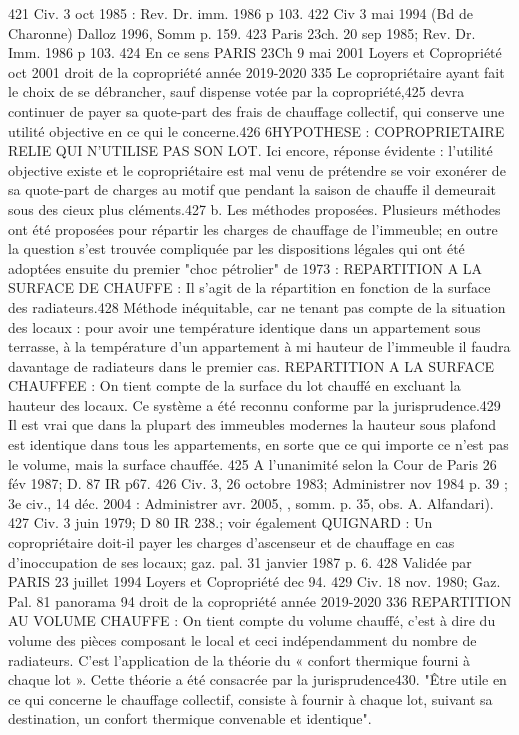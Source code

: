 		421 Civ. 3 oct 1985 : Rev. Dr. imm. 1986 p 103.
		422 Civ 3 mai 1994 (Bd de Charonne) Dalloz 1996, Somm p. 159.
		423 Paris 23\degres ch. 20 sep 1985; Rev. Dr. Imm. 1986 p 103.
		424 En ce sens PARIS 23\degres Ch 9 mai 2001 Loyers et Copropriété oct 2001 
		droit de la copropriété année 2019-2020
		335
		Le copropriétaire ayant fait le choix de se débrancher, sauf dispense votée par la copropriété,425 devra continuer de payer sa quote-part des frais de chauffage collectif, qui conserve une utilité objective en ce qui le concerne.426
		6\degres HYPOTHESE : COPROPRIETAIRE RELIE QUI N’UTILISE PAS SON LOT.
		Ici encore, réponse évidente : l’utilité objective existe et le copropriétaire est mal venu de prétendre se voir exonérer de sa quote-part de charges au motif que pendant la saison de chauffe il demeurait sous des cieux plus cléments.427
		b. Les méthodes proposées.
		Plusieurs méthodes ont été proposées pour répartir les charges de chauffage de l'immeuble; en outre la question s'est trouvée compliquée par les dispositions légales qui ont été adoptées ensuite du premier "choc pétrolier" de 1973 :
		REPARTITION A LA SURFACE DE CHAUFFE :
		Il s'agit de la répartition en fonction de la surface des radiateurs.428
		Méthode inéquitable, car ne tenant pas compte de la situation des locaux : pour avoir une température identique dans un appartement sous terrasse, à la température d'un appartement à mi hauteur de l'immeuble il faudra davantage de radiateurs dans le premier cas.
		REPARTITION A LA SURFACE CHAUFFEE :
		On tient compte de la surface du lot chauffé en excluant la hauteur des locaux.
		Ce système a été reconnu conforme par la jurisprudence.429 Il est vrai que dans la plupart des immeubles modernes la hauteur sous plafond est identique dans tous les appartements, en sorte que ce qui importe ce n'est pas le volume, mais la surface chauffée.
		425 A l’unanimité selon la Cour de Paris 26 fév 1987; D. 87 IR p67. 426 Civ. 3\degres, 26 octobre 1983; Administrer nov 1984 p. 39 ; 3e civ., 14 déc. 2004 : Administrer avr. 2005, , somm. p. 35, obs. A. Alfandari).
		427 Civ. 3 juin 1979; D 80 IR 238.; voir également QUIGNARD : Un copropriétaire doit-il payer les charges d’ascenseur et de chauffage en cas d’inoccupation de ses locaux; gaz. pal. 31 janvier 1987 p. 6.
		428 Validée par PARIS 23 juillet 1994 Loyers et Copropriété dec 94.
		429 Civ. 18 nov. 1980; Gaz. Pal. 81 panorama 94
		droit de la copropriété année 2019-2020
		336
		REPARTITION AU VOLUME CHAUFFE :
		On tient compte du volume chauffé, c'est à dire du volume des pièces composant le local et ceci indépendamment du nombre de radiateurs. C'est l'application de la théorie du « confort thermique fourni à chaque lot ». Cette théorie a été consacrée par la jurisprudence430. "Être utile en ce qui concerne le chauffage collectif, consiste à fournir à chaque lot, suivant sa destination, un confort thermique convenable et identique".

